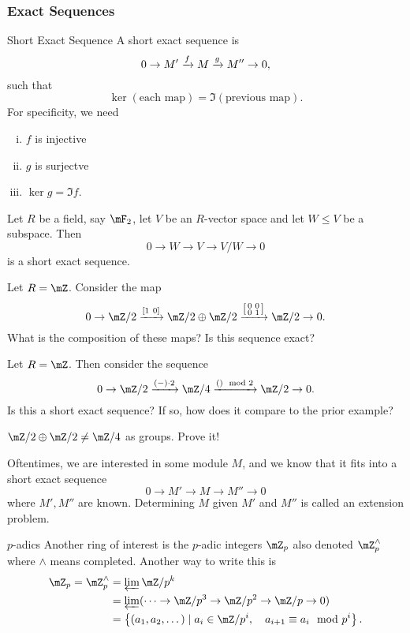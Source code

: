 \subsubsection{Exact Sequences}
\begin{definition}{Short Exact Sequence}{}
    A short exact sequence is $$0\to M'\xrightarrow{f}M\xrightarrow{g}M''\to 0,$$ such that $$\ker(\text{each map}) = \Im(\text{previous map}).$$ For specificity, we need 
    \begin{enumerate}[i.]
        \item $f$ is injective
        \item $g$ is surjectve
        \item $\ker g = \Im f$. 
    \end{enumerate}
\end{definition}
\begin{example}{}{}
    Let $R$ be a field, say $\mF_2$, let $V$ be an $R$-vector space and let $W\leq V$ be a subspace. Then $$0\to W\to V\to V/W\to 0$$ is a short exact sequence. 
\end{example}
\begin{example}{}{}
    Let $R =\mZ$. Consider the map $$0\to \mZ/2\xr{[1~0]}\mZ/2\oplus \mZ/2\xr{\begin{bsmallmatrix}
        0 & 0\\ 0 & 1 
    \end{bsmallmatrix}}\mZ/2\to 0.$$ What is the composition of these maps? Is this sequence exact?
\end{example}
\begin{example}{}{}
    Let $R = \mZ$. Then consider the sequence $$0\to \mZ/2\xr{(-)\cdot 2}\mZ/4\xr{()\mod 2}\mZ/2\to 0.$$ Is this a short exact sequence? If so, how does it compare to the prior example?
\end{example}
\begin{remark}{}{}
    $\mZ/2\oplus \mZ/2\neq \mZ/4$ as groups. Prove it!
\end{remark}
Oftentimes, we are interested in some module $M$, and we know that it fits into a short exact sequence $$0\to M'\to M\to M''\to 0$$ where $M',M''$ are known. Determining $M$ given $M'$ and $M''$ is called an extension problem.

\begin{definition}{$p$-adics}{}
    Another ring of interest is the $p$-adic integers $\mZ_p$ also denoted $\mZ_p^\wedge$ where $\wedge$ means completed. Another way to write this is \begin{align*}\mZ_p = \mZ_p^\wedge &= \varprojlim \mZ/p^k\\ &= \varprojlim(\cdots \to \mZ/p^3\to \mZ/p^2\to\mZ/p\to 0)\\ & = \sets{(a_1,a_2,\dots)\mid a_i \in \mZ/p^i, \quad a_{i+1}\equiv a_i \mod p^i}.\end{align*}
\end{definition}


